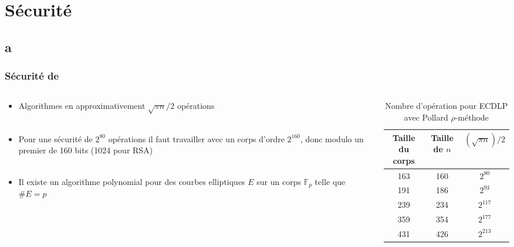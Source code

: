 \documentclass[9pt]{beamer}
\begin{document}
\section{Sécurité}

\subsection*{a}

\begin{frame}
    \frametitle{Sécurité de \ecdlp}
    \vfill
    \begin{columns}
        \begin{column}{0.40\linewidth}
            \begin{itemize}
                \item Algorithmes en approximativement $\sqrt{\pi n}/2$ opérations\\~
                    \vfill
                \item Pour une sécurité de $2^{80}$ opérations il faut travailler avec un corps
                    d'ordre $2^{160}$, donc modulo un premier de 160 bits (1024 pour RSA)\\~
                    \vfill
                \item Il existe un algorithme polynomial pour des courbes elliptiques $E$ sur un corps
                    $\mathbb{F}_p$ telle que $\#E = p$
            \end{itemize}
            \vfill
        \end{column}
        \begin{column}{0.50\linewidth}
            \begin{table}
                \begin{tabular}{ccc}
                    Taille du corps & Taille de $n$ & $(\sqrt{\pi n})/2$ \\
                    \hline
                    163 & 160 & $2^{80}$ \\
                    191 & 186 & $2^{93}$ \\
                    239 & 234 & $2^{117}$ \\
                    359 & 354 & $2^{177}$ \\
                    431 & 426 & $2^{213}$
                \end{tabular}
                \caption{Nombre d'opération pour ECDLP avec Pollard $\rho$-méthode}
            \end{table}
        \end{column}
    \end{columns}
\end{frame}
\end{document}
